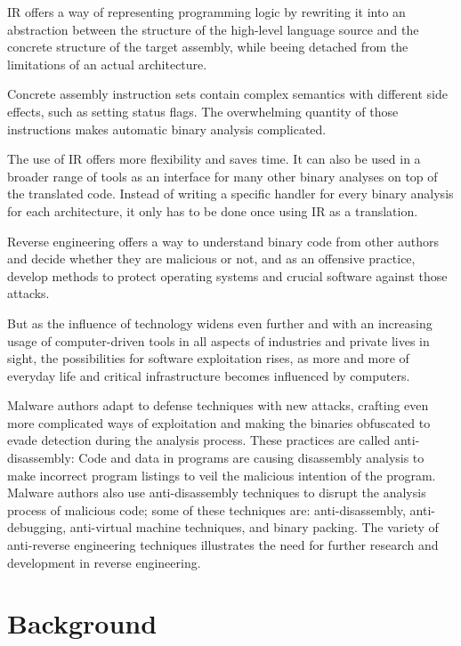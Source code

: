 \documentclass[seminar]{plai}
\begin{document}
IR offers a way of representing programming logic by rewriting it into an abstraction between the structure of the high-level language source and the concrete structure of the target assembly, while beeing detached from the limitations of an actual architecture.

Concrete assembly instruction sets contain complex semantics with different side effects, such as setting status flags.
The overwhelming quantity of those instructions makes automatic binary analysis complicated.

\noindent The use of IR offers more flexibility and saves time. It can also be used in a broader range of tools as an interface for many other binary analyses on top of the translated code. Instead of writing a specific handler for every binary analysis for each architecture, it only has to be done once using IR as a translation.

\noindent Reverse engineering offers a way to understand binary code from other authors and decide whether they are malicious or not, and as an offensive practice, develop methods to protect operating systems and crucial software against those attacks.

But as the influence of technology widens even further and with an increasing usage of computer-driven tools in all aspects of industries and private lives in sight, the possibilities for software exploitation rises, as more and more of everyday life and critical infrastructure becomes influenced by computers.

Malware authors adapt to defense techniques with new attacks, crafting even more complicated ways of exploitation and making the binaries obfuscated to evade detection during the analysis process.
These practices are called anti-disassembly: Code and data in programs are causing disassembly analysis to make incorrect program listings to veil the malicious intention of the program.
Malware authors also use anti-disassembly techniques to disrupt the analysis process of malicious code; some of these techniques are: anti-disassembly, anti-debugging, anti-virtual machine techniques, and binary packing.\cite{practical-malware-analysis}
The variety of anti-reverse engineering techniques illustrates the need for further research and development in reverse engineering.

\section{Background}
\label{sec:background}
\end{document}
